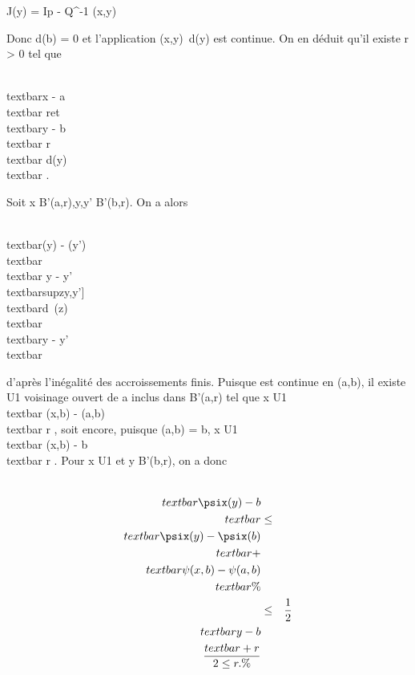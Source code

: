 J\psix(y) = Ip - Q^-1 \cdotQ(x,y)

Donc d\psia(b) = 0 et l'application
(x,y)\mapsto~d\psix(y) est continue. On en
déduit qu'il existe r \textgreater{} 0 tel que

\\textbar{}x - a\\textbar{} \leq
r\text et \\textbar{}y -
b\\textbar{} \leq r \rigtharrow~\\textbar{}
d\psix(y)\\textbar{}   .

Soit x \in B'(a,r),y,y' \in B'(b,r). On a alors

\\textbar{}\psix(y) -
\psix(y')\\textbar{} \leq\\textbar{} y
-
y'\\textbar{}supz\in{[}y,y'{]}\\textbar{}d\psix~(z)\\textbar{}
  \\textbar{}y -
y'\\textbar{}

d'après l'inégalité des accroissements finis. Puisque \psi est continue en
(a,b), il existe U1 voisinage ouvert de a inclus dans B'(a,r)
tel que x \in U1 \rigtharrow~\\textbar{} \psi(x,b) -
\psi(a,b)\\textbar{} \leq r  , soit
encore, puisque \psi(a,b) = b, x \in U1 \rigtharrow~\\textbar{}
\psi(x,b) - b\\textbar{} \leq r  .
Pour x \in U1 et y \in B'(b,r), on a donc

\begin{align*}
\\textbar{}\psix(y) -
b\\textbar{}& \leq&
\\textbar{}\psix(y) -
\psix(b)\\textbar{} +\\textbar{}
\psi(x,b) - \psi(a,b)\\textbar{}\%&
\\ & \leq& 1 \over 2
\\textbar{}y - b\\textbar{} + r
\over 2 \leq r. \%& \\
\end{align*}

